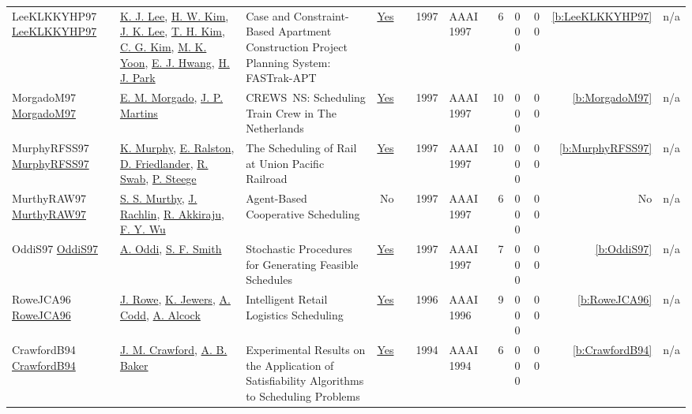 {\begin{longtable}{>{\raggedright\arraybackslash}p{3cm}>{\raggedright\arraybackslash}p{4.5cm}>{\raggedright\arraybackslash}p{6.0cm}rrrp{2.5cm}rp{1cm}p{1cm}rr}
LeeKLKKYHP97 \href{http://www.aaai.org/Library/IAAI/1997/iaai97-182.php}{LeeKLKKYHP97} & \hyperref[auth:a1303]{K. J. Lee}, \hyperref[auth:a1304]{H. W. Kim}, \hyperref[auth:a1305]{J. K. Lee}, \hyperref[auth:a1306]{T. H. Kim}, \hyperref[auth:a1307]{C. G. Kim}, \hyperref[auth:a1308]{M. K. Yoon}, \hyperref[auth:a1309]{E. J. Hwang}, \hyperref[auth:a1310]{H. J. Park} & Case and Constraint-Based Apartment Construction Project Planning System: FASTrak-APT & \href{../works/LeeKLKKYHP97.pdf}{Yes} & \cite{LeeKLKKYHP97} & 1997 & AAAI 1997 & 6 & 0 0 0 & 0 0 & \ref{b:LeeKLKKYHP97} & n/a\\
MorgadoM97 \href{http://www.aaai.org/Library/IAAI/1997/iaai97-186.php}{MorgadoM97} & \hyperref[auth:a1296]{E. M. Morgado}, \hyperref[auth:a1297]{J. P. Martins} & CREWS{\ }NS: Scheduling Train Crew in The Netherlands & \href{../works/MorgadoM97.pdf}{Yes} & \cite{MorgadoM97} & 1997 & AAAI 1997 & 10 & 0 0 0 & 0 0 & \ref{b:MorgadoM97} & n/a\\
MurphyRFSS97 \href{http://www.aaai.org/Library/IAAI/1997/iaai97-187.php}{MurphyRFSS97} & \hyperref[auth:a1298]{K. Murphy}, \hyperref[auth:a1299]{E. Ralston}, \hyperref[auth:a1300]{D. Friedlander}, \hyperref[auth:a1301]{R. Swab}, \hyperref[auth:a1302]{P. Steege} & The Scheduling of Rail at Union Pacific Railroad & \href{../works/MurphyRFSS97.pdf}{Yes} & \cite{MurphyRFSS97} & 1997 & AAAI 1997 & 10 & 0 0 0 & 0 0 & \ref{b:MurphyRFSS97} & n/a\\
MurthyRAW97 \href{}{MurthyRAW97} & \hyperref[auth:a1311]{S. S. Murthy}, \hyperref[auth:a1312]{J. Rachlin}, \hyperref[auth:a1313]{R. Akkiraju}, \hyperref[auth:a1314]{F. Y. Wu} & Agent-Based Cooperative Scheduling & No & \cite{MurthyRAW97} & 1997 & AAAI 1997 & 6 & 0 0 0 & 0 0 & No & n/a\\
OddiS97 \href{http://www.aaai.org/Library/AAAI/1997/aaai97-048.php}{OddiS97} & \hyperref[auth:a282]{A. Oddi}, \hyperref[auth:a298]{S. F. Smith} & Stochastic Procedures for Generating Feasible Schedules & \href{../works/OddiS97.pdf}{Yes} & \cite{OddiS97} & 1997 & AAAI 1997 & 7 & 0 0 0 & 0 0 & \ref{b:OddiS97} & n/a\\
RoweJCA96 \href{http://www.aaai.org/Library/IAAI/1996/iaai96-280.php}{RoweJCA96} & \hyperref[auth:a1284]{J. Rowe}, \hyperref[auth:a1285]{K. Jewers}, \hyperref[auth:a1286]{A. Codd}, \hyperref[auth:a1287]{A. Alcock} & Intelligent Retail Logistics Scheduling & \href{../works/RoweJCA96.pdf}{Yes} & \cite{RoweJCA96} & 1996 & AAAI 1996 & 9 & 0 0 0 & 0 0 & \ref{b:RoweJCA96} & n/a\\
CrawfordB94 \href{http://www.aaai.org/Library/AAAI/1994/aaai94-168.php}{CrawfordB94} & \hyperref[auth:a1278]{J. M. Crawford}, \hyperref[auth:a1279]{A. B. Baker} & Experimental Results on the Application of Satisfiability Algorithms to Scheduling Problems & \href{../works/CrawfordB94.pdf}{Yes} & \cite{CrawfordB94} & 1994 & AAAI 1994 & 6 & 0 0 0 & 0 0 & \ref{b:CrawfordB94} & n/a\\

\end{longtable}}
